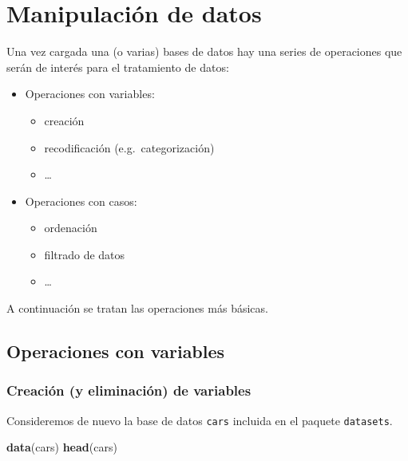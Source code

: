 \documentclass[]{book}
\newenvironment{Shaded}{\begin{snugshade}}{\end{snugshade}}
\newcommand{\KeywordTok}[1]{\textcolor[rgb]{0.13,0.29,0.53}{\textbf{#1}}}
\newcommand{\NormalTok}[1]{#1}
\providecommand{\tightlist}{%
  \setlength{\itemsep}{0pt}\setlength{\parskip}{0pt}}
\begin{document}
\section{Manipulación de datos}\label{manipulacion-de-datos-1}

Una vez cargada una (o varias) bases de datos hay una series de
operaciones que serán de interés para el tratamiento de datos:

\begin{itemize}
\tightlist
\item
  Operaciones con variables:

  \begin{itemize}
  \tightlist
  \item
    creación
  \item
    recodificación (e.g.~categorización)
  \item
    \ldots{}
  \end{itemize}
\item
  Operaciones con casos:

  \begin{itemize}
  \tightlist
  \item
    ordenación
  \item
    filtrado de datos
  \item
    \ldots{}
  \end{itemize}
\end{itemize}

A continuación se tratan las operaciones más básicas.

\subsection{Operaciones con variables}\label{operaciones-con-variables}

\subsubsection{Creación (y eliminación) de
variables}\label{creacion-y-eliminacion-de-variables}

Consideremos de nuevo la base de datos \texttt{cars} incluida en el
paquete \texttt{datasets}.

\begin{Shaded}
\begin{Highlighting}[]
\KeywordTok{data}\NormalTok{(cars)}
\KeywordTok{head}\NormalTok{(cars)}
\end{Highlighting}
\end{Shaded}
\end{document}
